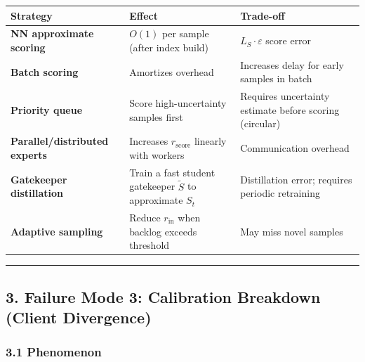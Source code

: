 \documentclass[
  12pt,
]{article}
\begin{document}
\begin{longtable}[]{@{}
  >{\raggedright\arraybackslash}p{}
  >{\raggedright\arraybackslash}p{}
  >{\raggedright\arraybackslash}p{}@{}}
\toprule\noalign{}
\begin{minipage}[b]{\linewidth}\raggedright
Strategy
\end{minipage} & \begin{minipage}[b]{\linewidth}\raggedright
Effect
\end{minipage} & \begin{minipage}[b]{\linewidth}\raggedright
Trade-off
\end{minipage} \\
\midrule\noalign{}
\endhead
\bottomrule\noalign{}
\endlastfoot
\textbf{NN approximate scoring} & \(O(1)\) per sample (after index
build) & \(L_S \cdot \varepsilon\) score error \\
\textbf{Batch scoring} & Amortizes overhead & Increases delay for early
samples in batch \\
\textbf{Priority queue} & Score high-uncertainty samples first &
Requires uncertainty estimate before scoring (circular) \\
\textbf{Parallel/distributed experts} & Increases \(r_{\text{score}}\)
linearly with workers & Communication overhead \\
\textbf{Gatekeeper distillation} & Train a fast student gatekeeper
\(\tilde{S}\) to approximate \(S_t\) & Distillation error; requires
periodic retraining \\
\textbf{Adaptive sampling} & Reduce \(r_{\text{in}}\) when backlog
exceeds threshold & May miss novel samples \\
\end{longtable}

\begin{center}\rule{0.5\linewidth}{0.5pt}\end{center}

\subsection{3. Failure Mode 3: Calibration Breakdown (Client
Divergence)}\label{failure-mode-3-calibration-breakdown-client-divergence}

\subsubsection{3.1 Phenomenon}\label{phenomenon-2}
\end{document}
